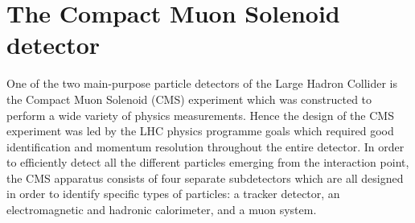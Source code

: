 
\section{The Compact Muon Solenoid detector} 

One of the two main-purpose particle detectors of the Large Hadron Collider is the Compact Muon Solenoid (CMS) experiment which was constructed to perform a wide variety of physics measurements. Hence the design of the CMS experiment was led by the LHC physics programme goals which required good identification and momentum resolution throughout the entire detector.
In order to efficiently detect all the different particles emerging from the interaction point, the CMS apparatus consists of four separate subdetectors which are all designed in order to identify specific types of particles: a tracker detector, an electromagnetic and hadronic calorimeter, and a muon system.

